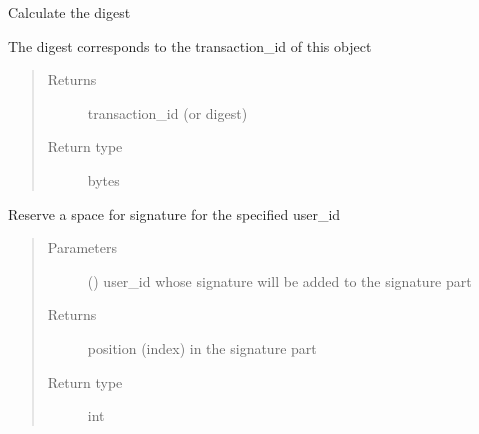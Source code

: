 \documentclass[letterpaper,10pt,english]{sphinxmanual}
\begin{document}
\begin{fulllineitems}
\begin{fulllineitems}
\end{fulllineitems}


\begin{fulllineitems}
\label{\detokenize{bbc1.core.bbclib:bbc1.core.bbclib.BBcTransaction.digest}}
Calculate the digest

The digest corresponds to the transaction\_id of this object
\begin{quote}\begin{description}
\item[{Returns}] \leavevmode
transaction\_id (or digest)

\item[{Return type}] \leavevmode
bytes

\end{description}\end{quote}

\end{fulllineitems}


\begin{fulllineitems}
\label{\detokenize{bbc1.core.bbclib:bbc1.core.bbclib.BBcTransaction.get_sig_index}}
Reserve a space for signature for the specified user\_id
\begin{quote}\begin{description}
\item[{Parameters}] \leavevmode
{} () \textendash{} user\_id whose signature will be added to the signature part

\item[{Returns}] \leavevmode
position (index) in the signature part

\item[{Return type}] \leavevmode
int

\end{description}\end{quote}

\end{fulllineitems}



\end{fulllineitems}
\end{document}
